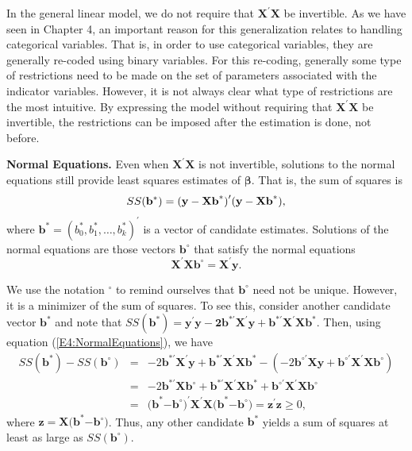 In the general linear model, we do not require that
$\mathbf{X}^{\prime}\mathbf{X}$ be invertible. As we have seen in
Chapter 4, an important reason for this generalization relates to
handling categorical variables. That is, in order to use categorical
variables, they are generally re-coded using binary variables. For
this re-coding, generally some type of restrictions need to be made
on the set of parameters associated with the indicator variables.
However, it is not always clear what type of restrictions are the
most intuitive. By expressing the model without requiring that $\mathbf{X}%
^{\prime}\mathbf{X}$ be invertible, the restrictions can be imposed
after the estimation is done, not before.

\textbf{Normal Equations.} Even when $\mathbf{X}^{\prime}\mathbf{X}$
is not invertible, solutions to the normal equations still provide
least squares estimates of $\boldsymbol \beta $. That is, the sum of
squares is
\begin{equation*}
SS(\mathbf{b}^{\ast})=\mathbf{(y-Xb}^{\ast}\mathbf{)}^{\prime}\mathbf{%
(y-Xb}^{\ast}\mathbf{),}
\end{equation*}
where
$\mathbf{b}^{\ast}=(b_0^{\ast},b_1^{\ast},\ldots,b_k^{\ast})^{\prime}$
is a vector of candidate estimates. Solutions of the normal
equations are those vectors $\mathbf{b}^{\circ }$ that satisfy the
normal equations
\begin{equation}\label{E4:NormalEquations}
\mathbf{X}^{\prime}\mathbf{Xb}^{\circ }=\mathbf{X}^{\prime}\mathbf{y.}%
\end{equation}

\noindent We use the notation $^{\circ }$ to remind ourselves that
$\mathbf{b}^{\circ }$ need not be unique. However, it is a minimizer
of the sum of squares. To see
this, consider another candidate vector $\mathbf{b}^{\ast}$ and note that $SS(%
\mathbf{b}^{\ast})=\mathbf{y}^{\prime}\mathbf{y-2b}^{\ast \prime }\mathbf{X%
}^{\prime}\mathbf{y+b}^{\ast \prime
}\mathbf{X}^{\prime}\mathbf{Xb}^{\ast} $. Then, using equation
(\ref{E4:NormalEquations}), we have
\begin{eqnarray*}
SS(\mathbf{b}^{\ast})-SS(\mathbf{b}^{\circ }) &=&-2\mathbf{b}^{\ast \prime }%
\mathbf{X}^{\prime}\mathbf{y}+\mathbf{b}^{\ast \prime }\mathbf{X}^{\prime}%
\mathbf{Xb}^{\ast}-(-2\mathbf{b}^{\circ \prime }\mathbf{Xy}+\mathbf{b}%
^{\circ \prime }\mathbf{X}^{\prime}\mathbf{Xb}^{\circ }) \\
&=&-2\mathbf{b}^{\ast \prime }\mathbf{Xb}^{\circ }+\mathbf{b}^{\ast \prime }%
\mathbf{X}^{\prime}\mathbf{Xb}^{\ast}+\mathbf{b}^{\circ \prime }\mathbf{X}%
^{\prime}\mathbf{Xb}^{\circ } \\
&=&\mathbf{(b}^{\ast}\mathbf{-b}^{\circ }\mathbf{)}^{\prime}\mathbf{X}%
^{\prime}\mathbf{X(b}^{\ast}\mathbf{-b}^{\circ }\mathbf{)}=\mathbf{z}%
^{\prime}\mathbf{z}\geq 0,
\end{eqnarray*}
\noindent where $\mathbf{z}=\mathbf{X(b}^{\ast}\mathbf{-b}^{\circ
}\mathbf{)}$. Thus, any other candidate $\mathbf{b}^{\ast}$ yields a
sum of squares at least as large as $SS(\mathbf{b}^{\circ })$.

